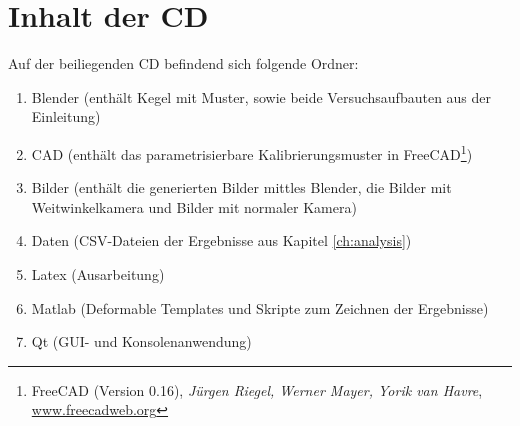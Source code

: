 \chapter{Inhalt der CD}
\label{ch:cdContent}

Auf der beiliegenden CD befindend sich folgende Ordner:
\begin{enumerate}
	\item Blender (enthält Kegel mit Muster, sowie beide Versuchsaufbauten aus der Einleitung)
	\item CAD (enthält das parametrisierbare Kalibrierungsmuster in FreeCAD\footnote{FreeCAD (Version 0.16), \textit{Jürgen Riegel, Werner Mayer, Yorik van Havre}, \url{www.freecadweb.org}})
	\item Bilder (enthält die generierten Bilder mittles Blender, die Bilder mit Weitwinkelkamera und Bilder mit normaler Kamera)
	\item Daten (CSV-Dateien der Ergebnisse aus Kapitel \ref{ch:analysis})
	\item Latex (Ausarbeitung)
	\item Matlab (Deformable Templates und Skripte zum Zeichnen der Ergebnisse)
	\item Qt (GUI- und Konsolenanwendung)

\end{enumerate}
